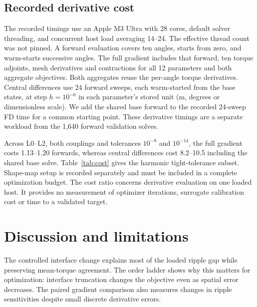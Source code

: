 \documentclass{anvil-paper}
\begin{document}
\subsection{Recorded derivative cost}
The recorded timings use an Apple M3 Ultra with 28 cores, default solver
threading, and concurrent host load averaging 14--24. The effective thread
count was not pinned. A forward evaluation covers ten angles, starts from
zero, and warm-starts successive angles. The full gradient includes that
forward, ten torque adjoints, mesh derivatives and contractions for all
12 parameters and both aggregate objectives. Both aggregates reuse the
per-angle torque derivatives. Central differences use 24 forward sweeps,
each warm-started from the base states, at step $h=10^{-6}$ in each
parameter's stored unit (m, degrees or dimensionless scale). We add the
shared base forward to the recorded 24-sweep FD time for a common starting
point. These derivative timings are a separate workload from the 1,640
forward validation solves.

Across L0--L2, both couplings and tolerances $10^{-8}$ and $10^{-14}$, the
full gradient costs 1.13--1.20 forwards, whereas central differences cost
8.2--10.5 including the shared base solve. Table~\ref{tab:cost} gives the harmonic tight-tolerance subset.
Shape-map setup is recorded separately and must be included in a complete
optimization budget. The cost ratio concerns derivative evaluation
on one loaded host. It provides no measurement of optimizer iterations,
surrogate calibration cost or time to a validated target.

\begin{table}[H]\centering\small
\caption{Recorded harmonic-model cost at relative tolerance $10^{-14}$,
initial design and full current. Times are seconds for ten-angle sweeps;
FD includes the shared base sweep, and setup is a one-time shape-map cost.}
\label{tab:cost}
\end{table}

\section{Discussion and limitations}
The controlled interface change explains most of the loaded ripple gap
while preserving mean-torque agreement. The order ladder shows why this
matters for optimization: interface truncation changes the objective even
as spatial error decreases. The paired gradient comparison also measures
changes in ripple sensitivities despite small discrete derivative errors.
\end{document}
